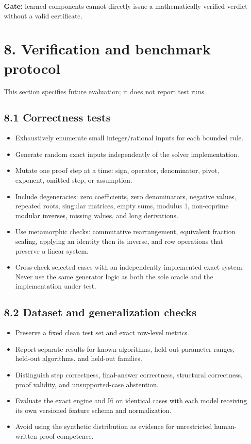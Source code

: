 \documentclass[
  10pt,
]{article}
\providecommand{\tightlist}{%
  \setlength{\itemsep}{0pt}\setlength{\parskip}{0pt}}
\begin{document}
\textbf{Gate:} learned components cannot directly issue a mathematically
verified verdict without a valid certificate.

\section{8. Verification and benchmark
protocol}\label{verification-and-benchmark-protocol}

This section specifies future evaluation; it does not report test runs.

\subsection{8.1 Correctness tests}\label{correctness-tests}

\begin{itemize}
\tightlist
\item
  Exhaustively enumerate small integer/rational inputs for each bounded
  rule.
\item
  Generate random exact inputs independently of the solver
  implementation.
\item
  Mutate one proof step at a time: sign, operator, denominator, pivot,
  exponent, omitted step, or assumption.
\item
  Include degeneracies: zero coefficients, zero denominators, negative
  values, repeated roots, singular matrices, empty sums, modulus 1,
  non-coprime modular inverses, missing values, and long derivations.
\item
  Use metamorphic checks: commutative rearrangement, equivalent fraction
  scaling, applying an identity then its inverse, and row operations
  that preserve a linear system.
\item
  Cross-check selected cases with an independently implemented exact
  system. Never use the same generator logic as both the sole oracle and
  the implementation under test.
\end{itemize}

\subsection{8.2 Dataset and generalization
checks}\label{dataset-and-generalization-checks}

\begin{itemize}
\tightlist
\item
  Preserve a fixed clean test set and exact row-level metrics.
\item
  Report separate results for known algorithms, held-out parameter
  ranges, held-out algorithms, and held-out families.
\item
  Distinguish step correctness, final-answer correctness, structural
  correctness, proof validity, and unsupported-case abstention.
\item
  Evaluate the exact engine and I6 on identical cases with each model
  receiving its own versioned feature schema and normalization.
\item
  Avoid using the synthetic distribution as evidence for unrestricted
  human-written proof competence.
\end{itemize}
\end{document}
